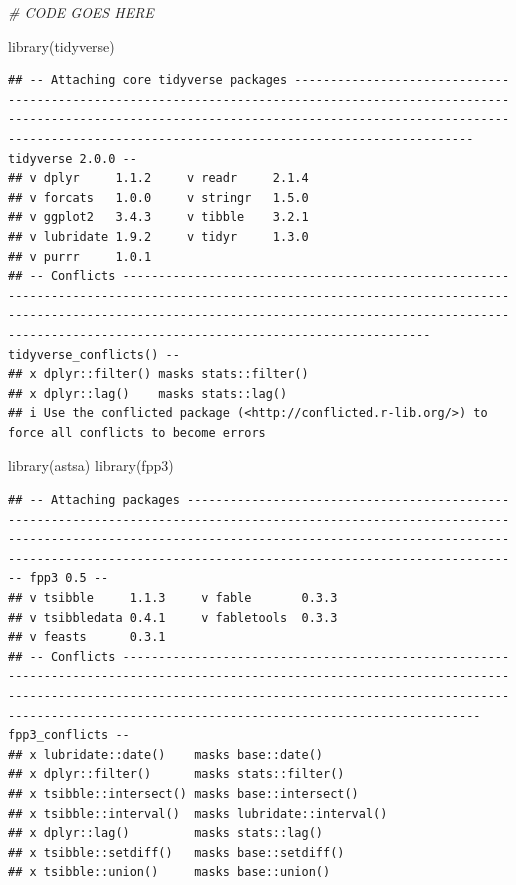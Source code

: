 \documentclass[
]{article}
\newenvironment{Shaded}{\begin{snugshade}}{\end{snugshade}}
\newcommand{\CommentTok}[1]{\textcolor[rgb]{0.56,0.35,0.01}{\textit{#1}}}
\newcommand{\FunctionTok}[1]{\textcolor[rgb]{0.00,0.00,0.00}{#1}}
\newcommand{\NormalTok}[1]{#1}
\begin{document}
\begin{Shaded}
\begin{Highlighting}[]
\CommentTok{\# CODE GOES HERE}

\FunctionTok{library}\NormalTok{(tidyverse)}
\end{Highlighting}
\end{Shaded}

\begin{verbatim}
## -- Attaching core tidyverse packages ------------------------------------------------------------------------------------------------------------------------------------------------------------------------------------------------------------------------------------------- tidyverse 2.0.0 --
## v dplyr     1.1.2     v readr     2.1.4
## v forcats   1.0.0     v stringr   1.5.0
## v ggplot2   3.4.3     v tibble    3.2.1
## v lubridate 1.9.2     v tidyr     1.3.0
## v purrr     1.0.1     
## -- Conflicts ------------------------------------------------------------------------------------------------------------------------------------------------------------------------------------------------------------------------------------------------------------- tidyverse_conflicts() --
## x dplyr::filter() masks stats::filter()
## x dplyr::lag()    masks stats::lag()
## i Use the conflicted package (<http://conflicted.r-lib.org/>) to force all conflicts to become errors
\end{verbatim}

\begin{Shaded}
\begin{Highlighting}[]
\FunctionTok{library}\NormalTok{(astsa)}
\FunctionTok{library}\NormalTok{(fpp3)}
\end{Highlighting}
\end{Shaded}

\begin{verbatim}
## -- Attaching packages ----------------------------------------------------------------------------------------------------------------------------------------------------------------------------------------------------------------------------------------------------------------- fpp3 0.5 --
## v tsibble     1.1.3     v fable       0.3.3
## v tsibbledata 0.4.1     v fabletools  0.3.3
## v feasts      0.3.1     
## -- Conflicts -------------------------------------------------------------------------------------------------------------------------------------------------------------------------------------------------------------------------------------------------------------------- fpp3_conflicts --
## x lubridate::date()    masks base::date()
## x dplyr::filter()      masks stats::filter()
## x tsibble::intersect() masks base::intersect()
## x tsibble::interval()  masks lubridate::interval()
## x dplyr::lag()         masks stats::lag()
## x tsibble::setdiff()   masks base::setdiff()
## x tsibble::union()     masks base::union()
\end{verbatim}
\end{document}
